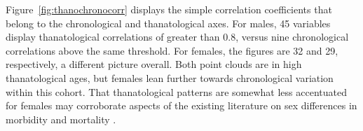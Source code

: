 \documentclass[11pt,oneside,a4paper]{article}
\begin{document}
\begin{figure}[!h]
{\begin{subfigure}{.7\textwidth}
	\end{subfigure}
	}
\end{figure}
	
Figure~\ref{fig:thanochronocorr} displays the simple correlation coefficients
that belong to the chronological and thanatological axes. For males, 45
variables display thanatological correlations of greater than 0.8, versus nine chronological
correlations above the same threshold. For females, the figures are 32 and 29,
respectively, a different picture overall. Both point clouds are in high
thanatological ages, but females lean further towards chronological variation
within this cohort. That thanatological patterns are somewhat less accentuated for females may
corroborate aspects of the existing literature on sex differences in morbidity and mortality \citep{case2005sex}.
	
\end{document}
